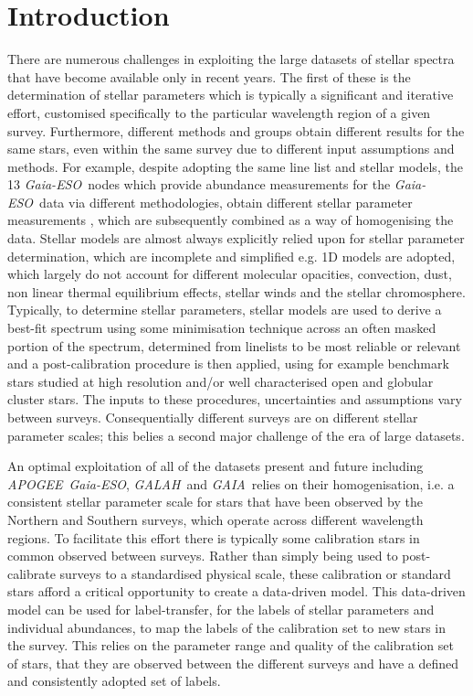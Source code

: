 \documentclass[12pt, preprint]{aastex}
\newcommand{\apogee}{\textsl{APOGEE}}
\newcommand{\galah}{\textsl{GALAH}}
\newcommand{\gaiaeso}{\textsl{Gaia-ESO}}
\newcommand{\gaia}{\textsl{GAIA}}
\begin{document}

\section{Introduction}

There are numerous challenges in exploiting the large datasets of stellar spectra that have become available only in recent years. The first of these is the determination of stellar parameters which is typically a significant and iterative effort, customised specifically to the particular wavelength region of a given survey. Furthermore, different methods and groups obtain different results for the same stars, even within the same survey due to different input assumptions and methods. For example, despite adopting the same line list and stellar models, the 13 \gaiaeso\ nodes which provide abundance measurements for the \gaiaeso\ data via different methodologies, obtain different stellar parameter measurements  \citep{Smiljanic2014}, which are subsequently combined as a way of homogenising the data.  Stellar models are almost always explicitly relied upon for stellar parameter determination, which are incomplete and simplified e.g. 1D models are adopted, which  largely do not account for different molecular opacities, convection, dust, non linear thermal equilibrium effects, stellar winds and the stellar chromosphere. Typically, to determine stellar parameters, stellar models are used to derive a best-fit spectrum using some minimisation technique across an often masked portion of the spectrum, determined from linelists to be most reliable or relevant and a post-calibration procedure is then applied, using for example benchmark stars studied at high resolution and/or well characterised open and globular cluster stars. The inputs to these procedures, uncertainties and assumptions vary between surveys. Consequentially different surveys are on different stellar parameter scales; this belies a second major challenge of the era of large datasets. 

An optimal exploitation of all of the datasets present and future including \apogee\, \gaiaeso, \galah\ and \gaia\ relies on their homogenisation, i.e. a consistent stellar parameter scale for stars that have been observed by the Northern and Southern surveys, which operate across different wavelength regions. To facilitate this effort there is typically some calibration stars in common observed between surveys. Rather than simply being used to post-calibrate surveys to a standardised physical scale, these calibration or standard stars afford a critical opportunity to create a data-driven model.  This data-driven model can be used for label-transfer, for the labels of stellar parameters and individual abundances, to map the labels of the calibration set to new stars in the survey. This relies on the parameter range and quality of the calibration set of stars, that they are observed between the different surveys and have a defined and consistently adopted set of labels. 
\end{document}
